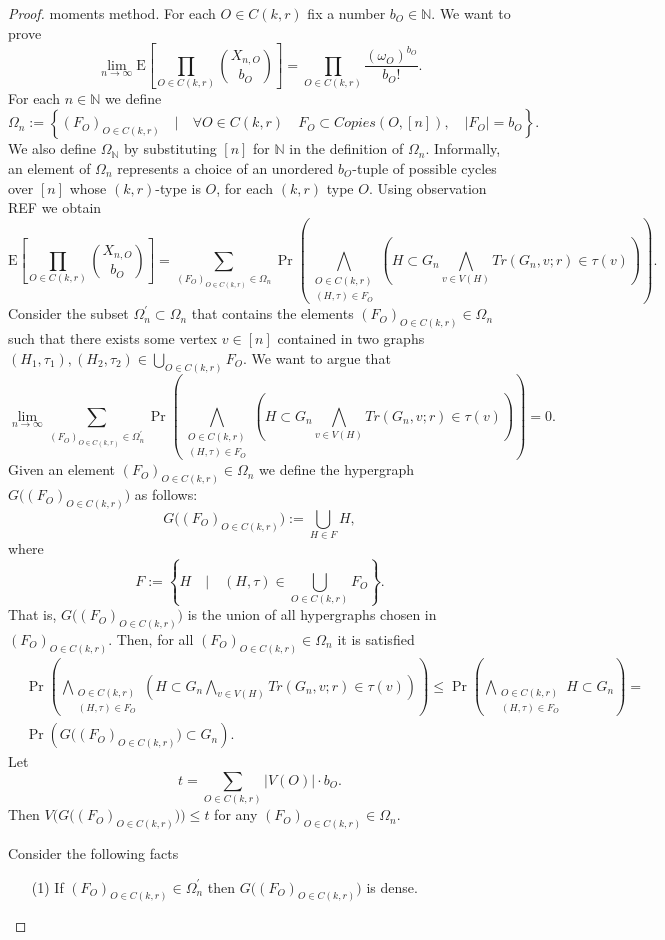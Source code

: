 \documentclass[12pt,notitlepage,a4paper]{article}
\theoremstyle{definition}
\newcommand{\N}{\mathbb{N}}
\newcommand{\Ln}{\lim\limits_{n\to \infty}}
\begin{document}
\begin{proof}
	moments method. For each $O\in C(k,r)$ fix a number $b_{O}\in\N$.
	We want to prove 
	\[
	\Ln 
	\mathrm{E}\left[
	\prod_{O\in C(k,r)}
	\binom{X_{n,O}}{b_O}
	\right]= \prod_{O\in C(k,r)} 
	\frac{(\omega_O)^{b_O}}{b_O!}.
	\]
	For each $n\in \N$ we define
	\[
	\Omega_n:=\left\{
	(F_O)_{O\in C(k,r)} \quad \Big|
	\quad \forall O\in C(k,r) \quad
	F_O\subset Copies(O,[n]), \quad
	|F_O|=b_O	
	\right\}.
	\]
	We also define $\Omega_\N$ by substituting $[n]$ for $\N$ in
	the definition of $\Omega_n$. Informally, an element of $\Omega_n$ 
	represents a choice of an unordered $b_O$-tuple
	of possible cycles over $[n]$ whose $(k,r)$-type is $O$, for each
	$(k,r)$ type $O$. Using observation REF we obtain
	\[
	\mathrm{E}\left[
	\prod_{O\in C(k,r)}
	\binom{X_{n,O}}{b_O}
	\right]=
	\sum_{(F_O)_{O\in C(k,r)}\in \Omega_n}
	\Pr\left(
	\bigwedge_{
	\substack{
	O\in C(k,r)\\
	(H,\tau)\in F_O
	}}
	\left(
	H\subset G_n
	\bigwedge_{v\in V(H)}
	Tr(G_n,v;r)\in \tau(v)
	\right)
	\right).
	\]
	Consider the subset $\Omega_n^\prime\subset \Omega_n$ that contains
	the elements $(F_O)_{O\in C(k,r)}\in \Omega_n$ such that there exists
	some vertex $v\in [n]$ contained in two graphs
	$(H_1,\tau_1),(H_2,\tau_2)\in \bigcup_{O\in C(k,r)} F_O$. We want to argue 
	that
	\begin{equation}\label{eqn:denseconfigurations}
	\Ln
	\sum_{(F_O)_{O\in C(k,r)}\in \Omega_n^\prime}
	\Pr\left(
	\bigwedge_{
		\substack{
			O\in C(k,r)\\
			(H,\tau)\in F_O
	}}
	\left(
	H\subset G_n
	\bigwedge_{v\in V(H)}
	Tr(G_n,v;r)\in \tau(v)
	\right)
	\right)=0.
	\end{equation}
	Given an element $(F_O)_{O\in C(k,r)}\in \Omega_n$ we 
	define the hypergraph $G\Big((F_O)_{O\in C(k,r)}\Big)$ as
	follows:
	\[
	G\Big((F_O)_{O\in C(k,r)}\Big):=
	\bigcup_{H\in F} H, 
	\]
	where
	\[
	F:=\left\{
	H \quad \Big| \quad 
	(H,\tau)\in \bigcup_{O\in C(k,r)} F_O	
	\right\}.
	\]
	That is, $G\Big((F_O)_{O\in C(k,r)}\Big)$
	is the union of all hypergraphs chosen in 
	$(F_O)_{O\in C(k,r)}$. Then, for all 
	$(F_O)_{O\in C(k,r)}\in \Omega_n$ it is 
	satisfied
	\begin{align*}
	&\Pr\left(
	\bigwedge_{
		\substack{
			O\in C(k,r)\\
			(H,\tau)\in F_O
	}}
	\left(
	H\subset G_n
	\bigwedge_{v\in V(H)}
	Tr(G_n,v;r)\in \tau(v)
	\right)
	\right)
	\leq 
	\Pr\left(
	\bigwedge_{
		\substack{
			O\in C(k,r)\\
			(H,\tau)\in F_O
	}}
	H\subset G_n
	\right) =
	\\&
	\Pr \left(
	G\Big((F_O)_{O\in C(k,r)}\Big) \subset G_n
	\right).
	\end{align*}
	Let 
	\[
	t = \sum_{O\in C(k,r)} |V(O)|\cdot b_O.
	\]
	Then $V\Big(
	G\Big((F_O)_{O\in C(k,r)}\Big)
	\Big) \leq t$
	for any $(F_O)_{O\in C(k,r)}\in \Omega_n$.\par
	Consider the following facts
	\begin{itemize}
		\item[(1)] If $(F_O)_{O\in C(k,r)}\in \Omega_n^\prime$ then
		$G\big((F_O)_{O\in C(k,r)}\big)$ is dense.
		 

\end{itemize}
\end{proof}
\end{document}
